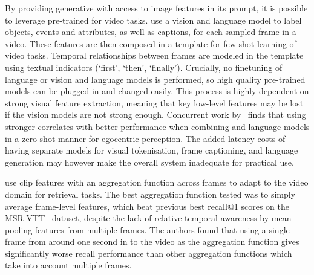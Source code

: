 By providing generative  with access to image features in its
prompt, it is possible to leverage pre-trained  for video
tasks. \citet{wang2022vidil} use a vision and language model to label objects,
events and attributes, as well as captions, for each sampled frame in a video.
These features are then composed in a template for few-shot learning of video
tasks.  Temporal relationships between frames are modeled in the template using
textual indicators (`first', `then', `finally'). Crucially, no finetuning of
language or vision and language models is performed, so high quality
pre-trained models can be plugged in and changed easily. This process is highly
dependent on strong visual feature extraction, meaning that key low-level
features may be lost if the vision models are not strong enough. Concurrent
work by~\citet{zeng2023socratic} finds that using stronger 
correlates with better performance when combining  and language
models in a zero-shot manner for egocentric perception. The added latency costs
of having separate models for visual tokenisation, frame captioning, and
language generation may however make the overall system inadequate for
practical use.

\citet{portilloquintero2021clipvidret} use \acrshort{clip} features with an
aggregation function across frames to adapt to the video domain for retrieval
tasks. The best aggregation function tested was to simply average frame-level
features, which beat previous best recall@1 scores on the
MSR-VTT~\citep{xu2016msr-vtt} dataset, despite the lack of relative temporal
awareness by mean pooling features from multiple frames. The authors found that
using a single frame from around one second in to the video as the aggregation
function gives significantly worse recall performance than other aggregation
functions which take into account multiple frames.

